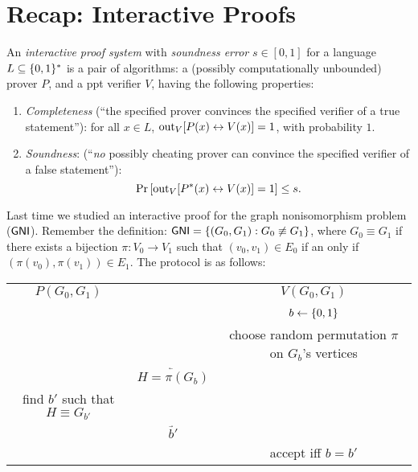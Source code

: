 \documentclass[11pt]{article}
\begin{document}
\thispagestyle{fancy}           %


\section{Recap: Interactive Proofs}
\label{sec:recap:IP}

\begin{definition}
  \label{def:ips}
  An \emph{interactive proof system} with \emph{soundness error} $s
  \in [0,1]$ for a language $L \subseteq \{0,1\}^{*}$ is a pair of
  algorithms: a (possibly computationally unbounded) prover $P$, and a
  ppt verifier $V$, having the following properties:
  \begin{enumerate}
  \item \emph{Completeness} (``the specified prover convinces the
    specified verifier of a true statement''): for all $x \in L$,
    $\text{out}_{V}[ P(x) \leftrightarrow V(x) ] = 1$, with probability $1$.
  \item \emph{Soundness}: (``\emph{no} possibly cheating prover can
    convince the specified verifier of a false statement''):
    \[ \Pr\left[ \text{out}_{V}[ P^{*}(x) \leftrightarrow V(x) ] = 1 \right]
    \leq s. \]
  \end{enumerate}
\end{definition}

\newcommand{\gni}{\problem{GNI}}

Last time we studied an interactive proof for the graph nonisomorphism
problem ($\gni$).  Remember the definition: $ \gni=\set{(G_0,G_1) :
  G_0 \not\equiv G_1}$, where $G_0 \equiv G_1$ if there exists a
bijection $\pi \colon V_0 \to V_1$ such that $(v_0,v_1) \in E_0$ if an
only if $(\pi(v_0),\pi(v_1)) \in E_1$.  The protocol is as follows:

\begin{center}
  \begin{tabular}{ccc}
    $P(G_{0}, G_{1})$ & & $V(G_{0},G_{1})$ \\ \\
    & & $b \gets \{0,1\}$\\
    && choose random permutation $\pi$ on $G_{b}$'s vertices \\
    &$\underleftarrow{H=\pi(G_b)}$ & \\
    find $b'$ such that $H\equiv G_{b'}$ &&\\
    & $\underrightarrow{\qquad b' \qquad}$ &\\
    && accept iff $b=b'$
  \end{tabular}
\end{center}
\end{document}
